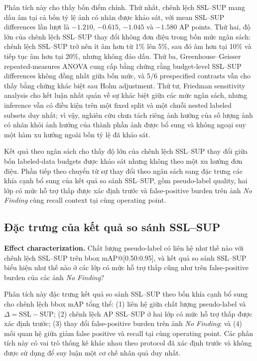 \documentclass[pdflatex,sn-mathphys-num]{sn-jnl}%
\theoremstyle{thmstyleone}%
\theoremstyle{thmstyletwo}%
\theoremstyle{thmstylethree}%
\begin{document}
Phân tích này cho thấy bốn điểm chính. Thứ nhất, chênh lệch SSL--SUP mang dấu âm tại cả bốn tỷ lệ ảnh có nhãn được khảo sát, với mean SSL--SUP differences lần lượt là $-1.210$, $-0.615$, $-1.045$ và $-1.580$ AP points. Thứ hai, độ lớn của chênh lệch SSL--SUP thay đổi không đơn điệu trong bốn mức ngân sách: chênh lệch SSL--SUP trở nên ít âm hơn từ 1\% lên 5\%, sau đó âm hơn tại 10\% và tiếp tục âm hơn tại 20\%, nhưng không đảo dấu. Thứ ba, Greenhouse--Geisser repeated-measures ANOVA cung cấp bằng chứng rằng budget-level SSL--SUP differences không đồng nhất giữa bốn mức, và 5/6 prespecified contrasts vẫn cho thấy bằng chứng khác biệt sau Holm adjustment. Thứ tư, Friedman sensitivity analysis cho kết luận nhất quán về sự khác biệt giữa các mức ngân sách, nhưng inference vẫn có điều kiện trên một fixed split và một chuỗi nested labeled subsets duy nhất; vì vậy, nghiên cứu chưa tách riêng ảnh hưởng của số lượng ảnh có nhãn khỏi ảnh hưởng của thành phần ảnh được bổ sung và không ngoại suy một hàm xu hướng ngoài bốn tỷ lệ đã khảo sát.

Kết quả theo ngân sách cho thấy độ lớn của chênh lệch SSL--SUP thay đổi giữa bốn
labeled-data budgets được khảo sát nhưng không theo một xu hướng đơn điệu.
Phần tiếp theo chuyển từ sự thay đổi theo ngân sách sang đặc trưng các khía
cạnh bổ sung của kết quả so sánh SSL--SUP, gồm pseudo-label quality, hai lớp có mức
hỗ trợ thấp được xác định trước và false-positive burden trên ảnh
\textit{No Finding} cùng recall context tại cùng operating point.

\subsection{Đặc trưng của kết quả so sánh SSL--SUP}
\label{sec:results_sq2}

\textbf{Effect characterization.} Chất lượng pseudo-label có liên hệ như thế nào với chênh lệch SSL--SUP trên bbox mAP@[0.50:0.95], và kết quả so sánh SSL--SUP biểu hiện như thế nào ở các lớp có mức hỗ trợ thấp cũng như trên false-positive burden của các ảnh \textit{No Finding}?

Phân tích này đặc trưng kết quả so sánh SSL--SUP theo bốn khía cạnh bổ sung cho chênh lệch bbox mAP tổng thể: (1) liên hệ giữa chất lượng pseudo-label và $\Delta=\mathrm{SSL}-\mathrm{SUP}$; (2) chênh lệch AP SSL--SUP ở hai lớp có mức hỗ trợ thấp được xác định trước; (3) thay đổi false-positive burden trên ảnh \textit{No Finding}; và (4) mối quan hệ giữa giảm false positive và recall tại cùng operating point. Các phân tích này có vai trò thống kê khác nhau theo protocol đã xác định trước và không được sử dụng để suy luận một cơ chế nhân quả duy nhất.
\end{document}
